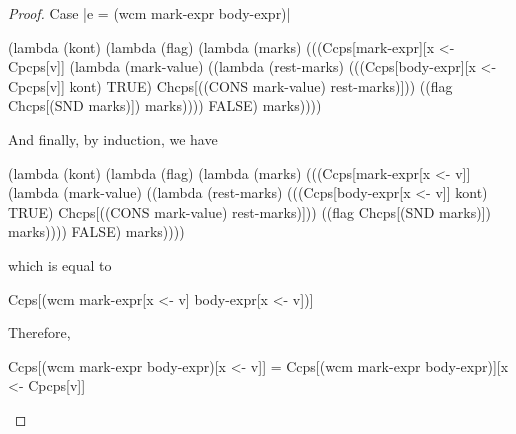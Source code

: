 \begin{proof}{Case \scheme|e = (wcm mark-expr body-expr)|}
\begin{schemeblock}
\begin{schemedisplay}
(lambda (kont)
  (lambda (flag)
    (lambda (marks)
      (((Ccps[mark-expr][x <- Cpcps[v]]
          (lambda (mark-value) 
            ((lambda (rest-marks) 
               (((Ccps[body-expr][x <- Cpcps[v]] kont) TRUE) Chcps[((CONS mark-value) rest-marks)]))
             ((flag Chcps[(SND marks)]) marks))))
        FALSE) marks))))
\end{schemedisplay}
\end{schemeblock}

And finally, by induction, we have
\begin{schemeblock}
\begin{schemedisplay}
(lambda (kont)
  (lambda (flag)
    (lambda (marks)
      (((Ccps[mark-expr[x <- v]]
          (lambda (mark-value) 
            ((lambda (rest-marks) 
               (((Ccps[body-expr[x <- v]] kont) TRUE) Chcps[((CONS mark-value) rest-marks)]))
             ((flag Chcps[(SND marks)]) marks))))
        FALSE) marks))))
\end{schemedisplay}
\end{schemeblock}
which is equal to
\begin{schemeblock}
\begin{schemedisplay}
Ccps[(wcm mark-expr[x <- v] body-expr[x <- v])]
\end{schemedisplay}
\end{schemeblock}

Therefore,
\begin{schemeblock}
\begin{schemedisplay}
Ccps[(wcm mark-expr body-expr)[x <- v]] = Ccps[(wcm mark-expr body-expr)][x <- Cpcps[v]]
\end{schemedisplay}
\end{schemeblock}
\end{proof}

